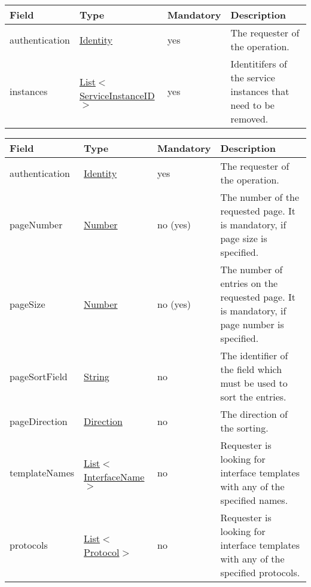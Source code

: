 \documentclass[a4paper]{arrowhead}
\newcommand{\pref}[1]{{\textcolor{ArrowheadGrey}{\hyperref[sec:model:primitives:#1]{#1}}}}
\begin{document}

\begin{table}[ht!]
\begin{tabularx}{\textwidth}{| p{2.5cm} | p{4cm} | p{2cm} | X |} \hline
\rowcolor{gray!33} Field & Type & Mandatory & Description \\ \hline
authentication & \hyperref[sec:model:Identity]{Identity} & yes & The requester of the operation. \\ \hline
instances &  \pref{List}$<$\pref{ServiceInstanceID}$>$ & yes & Identitifers of the service instances that need to be removed. \\ \hline
\end{tabularx}
\end{table}


\begin{table}[H]
\begin{tabularx}{\textwidth}{| p{2.5cm} | p{4cm} | p{2cm} | X |} \hline
\rowcolor{gray!33} Field & Type & Mandatory & Description \\ \hline
authentication & \hyperref[sec:model:Identity]{Identity} & yes & The requester of the ope\-ration. \\ \hline
pageNumber & \pref{Number} & no (yes) & The number of the requested page. It is mandatory, if page size is specified. \\ \hline
pageSize & \pref{Number} & no (yes) & The number of entries on the requested page. It is mandatory, if page number is specified. \\ \hline
pageSortField & \pref{String} & no & The identifier of the field which must be used to sort the entries. \\ \hline
pageDirection & \pref{Direction} & no & The direction of the sorting. \\ \hline
templateNames &  \pref{List}$<$\pref{InterfaceName}$>$ & no & Requester is looking for interface templates with any of the spe\-cified names. \\ \hline
protocols &  \pref{List}$<$\pref{Protocol}$>$ & no & Requester is looking for interface templates with any of the specified protocols. \\ \hline
\end{tabularx}
\end{table}

\clearpage

\end{document}
